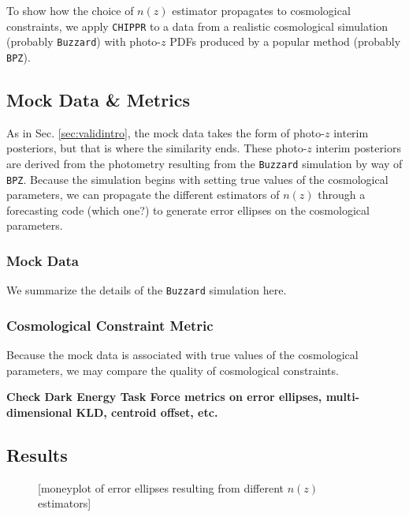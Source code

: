 \documentclass[iop]{emulateapj}
\newcommand{\chippr}{\texttt{CHIPPR} }
\begin{document}
To show how the choice of $n(z)$ estimator propagates to cosmological constraints, we apply \chippr to a data from a realistic cosmological simulation (probably \texttt{Buzzard}) with photo-$z$ PDFs produced by a popular method (probably \texttt{BPZ}).

\subsection{Mock Data \& Metrics}
\label{sec:appintro}

As in Sec. \ref{sec:validintro}, the mock data takes the form of photo-$z$ interim posteriors, but that is where the similarity ends.  These photo-$z$ interim posteriors are derived from the photometry resulting from the \texttt{Buzzard} simulation by way of \texttt{BPZ}.  Because the simulation begins with setting true values of the cosmological parameters, we can propagate the different estimators of $n(z)$ through a forecasting code (which one?) to generate error ellipses on the cosmological parameters.

\subsubsection{Mock Data}
\label{sec:buzzard}

We summarize the details of the \texttt{Buzzard} simulation here.

\subsubsection{Cosmological Constraint Metric}
\label{sec:cosmo}

Because the mock data is associated with true values of the cosmological parameters, we may compare the quality of cosmological constraints.

\textbf{Check Dark Energy Task Force metrics on error ellipses, multi-dimensional KLD, centroid offset, etc.}

\subsection{Results}
\label{sec:results}

\begin{figure}
	\begin{center}
		\caption{[moneyplot of error ellipses resulting from different $n(z)$ estimators]}
		\label{fig:money}
	\end{center}
\end{figure}
\end{document}
